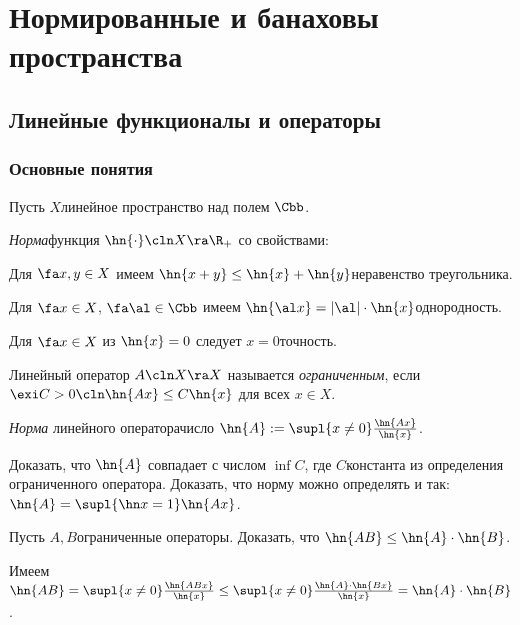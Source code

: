 \documentclass[a4paper]{article}
\begin{document}
\section{Нормированные и банаховы пространства}

\subsection{Линейные функционалы и операторы}

\subsubsection{Основные понятия}

Пусть $X$\т линейное пространство над полем $\Cbb$.

\begin{df}
\emph{Норма}\т функция $\hn{\cdot}\cln X\ra \R_+$ со свойствами:
\begin{points}{-3}
\item Для $\fa x, y \in X$ имеем $\hn{x+y} \le \hn{x} + \hn{y}$\т неравенство треугольника.
\item Для $\fa x \in X$, $\fa \al \in \Cbb$ имеем $\hn{\al x} = |\al|\cdot\hn{x}$\т однородность.
\item Для $\fa x \in X$ из $\hn{x} = 0$ следует $x = 0$\т точность.
\end{points}
\end{df}

\begin{df}
Линейный оператор $A\cln X \ra X$ называется \emph{ограниченным}, если
$\exi C > 0\cln \hn{Ax} \le C\hn{x}$ для всех $x \in X$.
\end{df}

\begin{df}
\emph{Норма} линейного оператора\т число $\hn{A} := \supl{x\neq 0} \frac{\hn{Ax}}{\hn{x}}$.
\end{df}

\begin{problem}
Доказать, что $\hn{A}$ совпадает с числом $\inf C$, где $C$\т константа из
определения ограниченного оператора. Доказать, что норму можно определять и так:
$\hn{A} = \supl{\hn x =1} \hn{Ax}$.
\end{problem}

\begin{problem}
Пусть $A, B$\т ограниченные операторы. Доказать, что $\hn{AB} \le \hn{A} \cdot \hn{B}$.
\end{problem}
\begin{solution}
Имеем $\hn{AB} = \supl{x \neq 0} \frac{\hn{ABx}}{\hn{x}} \le
\supl{x \neq 0} \frac{\hn{A}\cdot \hn{Bx}}{\hn{x}} = \hn{A}\cdot \hn{B}$.
\end{solution}
\end{document}
